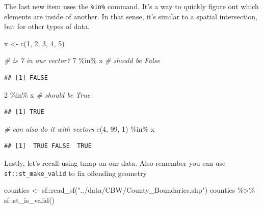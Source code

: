 \documentclass[]{article}
\newenvironment{Shaded}{\begin{snugshade}}{\end{snugshade}}
\newcommand{\CommentTok}[1]{\textcolor[rgb]{0.56,0.35,0.01}{\textit{#1}}}
\newcommand{\DecValTok}[1]{\textcolor[rgb]{0.00,0.00,0.81}{#1}}
\newcommand{\FunctionTok}[1]{\textcolor[rgb]{0.00,0.00,0.00}{#1}}
\newcommand{\NormalTok}[1]{#1}
\newcommand{\OtherTok}[1]{\textcolor[rgb]{0.56,0.35,0.01}{#1}}
\newcommand{\SpecialCharTok}[1]{\textcolor[rgb]{0.00,0.00,0.00}{#1}}
\newcommand{\StringTok}[1]{\textcolor[rgb]{0.31,0.60,0.02}{#1}}
\begin{document}
The last new item uses the \texttt{\%in\%} command. It's a way to
quickly figure out which elements are inside of another. In that sense,
it's similar to a spatial intersection, but for other types of data.

\begin{Shaded}
\begin{Highlighting}[]
\NormalTok{x }\OtherTok{\textless{}{-}} \FunctionTok{c}\NormalTok{(}\DecValTok{1}\NormalTok{, }\DecValTok{2}\NormalTok{, }\DecValTok{3}\NormalTok{, }\DecValTok{4}\NormalTok{, }\DecValTok{5}\NormalTok{)}

\CommentTok{\# is 7 in our vector?}
\DecValTok{7} \SpecialCharTok{\%in\%}\NormalTok{ x }\CommentTok{\# should be False}
\end{Highlighting}
\end{Shaded}

\begin{verbatim}
## [1] FALSE
\end{verbatim}

\begin{Shaded}
\begin{Highlighting}[]
\DecValTok{2} \SpecialCharTok{\%in\%}\NormalTok{ x }\CommentTok{\# should be True}
\end{Highlighting}
\end{Shaded}

\begin{verbatim}
## [1] TRUE
\end{verbatim}

\begin{Shaded}
\begin{Highlighting}[]
\CommentTok{\# can also do it with vectors}
\FunctionTok{c}\NormalTok{(}\DecValTok{4}\NormalTok{, }\DecValTok{99}\NormalTok{, }\DecValTok{1}\NormalTok{) }\SpecialCharTok{\%in\%}\NormalTok{ x}
\end{Highlighting}
\end{Shaded}

\begin{verbatim}
## [1]  TRUE FALSE  TRUE
\end{verbatim}

Lastly, let's recall using tmap on our data. Also remember you can use
\texttt{sf::st\_make\_valid} to fix offending geometry

\begin{Shaded}
\begin{Highlighting}[]
\NormalTok{counties }\OtherTok{\textless{}{-}}\NormalTok{ sf}\SpecialCharTok{::}\FunctionTok{read\_sf}\NormalTok{(}\StringTok{"../data/CBW/County\_Boundaries.shp"}\NormalTok{)}
\NormalTok{counties }\SpecialCharTok{\%\textgreater{}\%}\NormalTok{ sf}\SpecialCharTok{::}\FunctionTok{st\_is\_valid}\NormalTok{()}
\end{Highlighting}
\end{Shaded}
\end{document}
